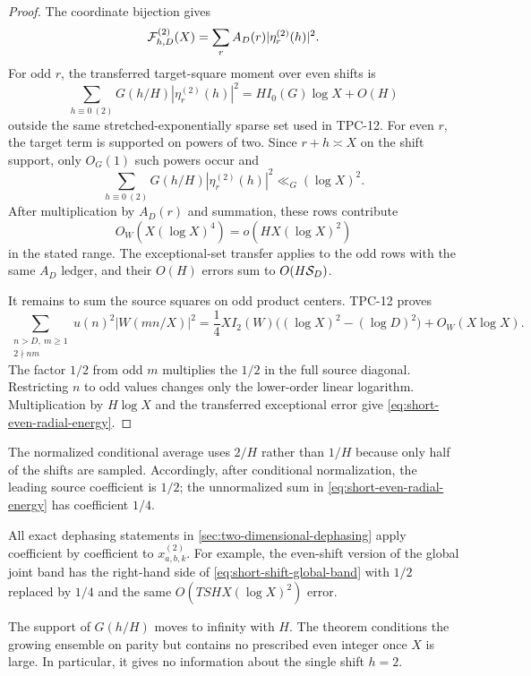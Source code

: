 \begin{proof}
The coordinate bijection gives
\[
 \mathcal F^{(2)}_{h,D}(X)
 =\sum_rA_D(r)|\eta_r^{(2)}(h)|^2.
\]
For odd $r$, the transferred target-square moment over even shifts is
\[
 \sum_{h\equiv0\ (2)}G(h/H)|\eta_r^{(2)}(h)|^2
 =HI_0(G)\log X+O(H)
\]
outside the same stretched-exponentially sparse set used in TPC-12.  For
even $r$, the target term is supported on powers of two.  Since
$r+h\asymp X$ on the shift support, only $O_G(1)$ such powers occur and
\[
 \sum_{h\equiv0\ (2)}G(h/H)|\eta_r^{(2)}(h)|^2
 \ll_G(\log X)^2.
\]
After multiplication by $A_D(r)$ and summation, these rows contribute
\[
 O_W(X(\log X)^4)=o(HX(\log X)^2)
\]
in the stated range.  The exceptional-set transfer applies to the odd
rows with the same $A_D$ ledger, and their $O(H)$ errors sum to
$O(H\mathcal S_D)$.

It remains to sum the source squares on odd product centers.  TPC-12
proves
\begin{equation}
 \sum_{\substack{n>D,\ m\geq1\\2\nmid nm}}
 u(n)^2|W(mn/X)|^2
 =\frac14XI_2(W)
 \bigl((\log X)^2-(\log D)^2\bigr)
 +O_W(X\log X).
 \label{eq:odd-product-source-diagonal}
\end{equation}
The factor $1/2$ from odd $m$ multiplies the $1/2$ in the full source
diagonal.  Restricting $n$ to odd values changes only the lower-order
linear logarithm.  Multiplication by $H\log X$ and the transferred
exceptional error give \eqref{eq:short-even-radial-energy}.
\end{proof}

The normalized conditional average uses $2/H$ rather than $1/H$ because
only half of the shifts are sampled.  Accordingly, after conditional
normalization, the leading source coefficient is $1/2$; the
unnormalized sum in \eqref{eq:short-even-radial-energy} has coefficient
$1/4$.

All exact dephasing statements in
\cref{sec:two-dimensional-dephasing} apply coefficient by coefficient to
$x^{(2)}_{a,b,k}$.  For example, the even-shift version of the global
joint band has the right-hand side of
\eqref{eq:short-shift-global-band} with $1/2$ replaced by $1/4$ and the
same $O(TSHX(\log X)^2)$ error.

\begin{remark}
The support of $G(h/H)$ moves to infinity with $H$.  The theorem
conditions the growing ensemble on parity but contains no prescribed
even integer once $X$ is large.  In particular, it gives no information
about the single shift $h=2$.
\end{remark}
